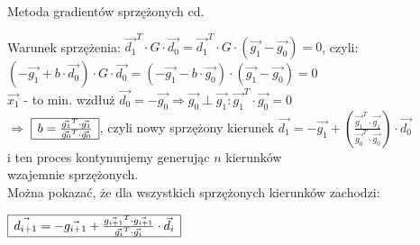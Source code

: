  \begin{frame}{Metoda gradientów sprzężonych cd. }

   \begin{block}{}
	  Warunek sprzężenia: $\vec{d_1}^T \cdot G \cdot \vec{d_0} = \vec{d_1}^T \cdot G \cdot (\vec{g_1} - \vec{g_0}) = 0$, czyli:
	  $(-\vec{g_1} + b \cdot \vec{d_0}) \cdot G \cdot \vec{d_0} = (-\vec{g_1} -b \cdot \vec{g_0}) \cdot (\vec{g_1} - \vec{g_0}) = 0$
	  \\$\vec{x_1}$ - to min. wzdłuż $\vec{d_0} = -\vec{g_0} \Rightarrow \vec{g_0} \perp \vec{g_1} : \vec{g_1}^T \cdot \vec{g_0} = 0$
	  \smallskip
	  \\$\Rightarrow$
	  $\begin{array}{|c|}
 	   	 \hline
 	   	    b = \frac{\vec{g_1}^T \cdot \vec{g_1}}{\vec{g_0}^T \cdot \vec{g_0}}
 	   	 \\ \hline
	  \end{array}$,
 	  czyli nowy sprzężony kierunek $\vec{d_1} = -\vec{g_1} + \left(\frac{\vec{g_1}^T \cdot \vec{g_1}}{\vec{g_0}^T \cdot \vec{g_0}}\right) \cdot \vec{d_0} $
 	  \medskip
 	  \\i ten proces kontynuujemy generując $n$ kierunków \\ wzajemnie sprzężonych.
 	  \medskip
 	  \\Można pokazać, że dla wszystkich sprzężonych kierunków zachodzi:
 	  \begin{center}
 	  	 $\begin{array}{|c|}
 	   	   \hline
 	   	      \vec{d_{i+1}} = -\vec{g_{i+1}} + \frac{\vec{g_{i+1}}^T \cdot \vec{g_{i+1}}}{\vec{g_{i}}^T \cdot \vec{g_{i}}} \cdot \vec{d_i}
 	   	   \\ \hline
	    \end{array}$
 	  \end{center}
 	\end{block}

  \end{frame}
